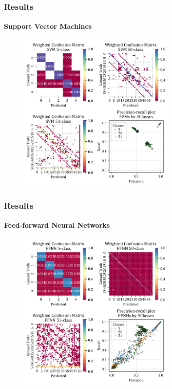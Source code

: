 \documentclass[xcolor={svgnames,table},10pt,fleqn]{beamer}
\begin{document}
\begin{frame}
    \frametitle{Results}
    \framesubtitle{Support Vector Machines}
    \begin{figure}[h]
        \centering
        \includegraphics[width=0.7\textwidth]{05_mean_conf_mat_svm.pdf}
    \end{figure}
\end{frame}

\begin{frame}
    \frametitle{Results}
    \framesubtitle{Feed-forward Neural Networks}
    \begin{figure}[h]
        \centering
        \includegraphics[width=0.7\textwidth]{05_mean_conf_mat_ffnn.pdf}
    \end{figure}
\end{frame}
\end{document}
